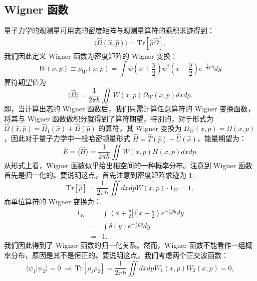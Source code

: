 \documentclass[10pt,UTF8]{ctexart}
\begin{document}
\subsection*{Wigner 函数}
\noindent
量子力学的观测量可用态的密度矩阵与观测量算符的乘积求迹得到：
\begin{eqnarray}
	\langle \hat\Omega(\hat x,\hat p)\rangle = \mathrm{Tr}[\hat \rho \hat \Omega],
\end{eqnarray}
我们因此定义 Wigner 函数为密度矩阵的 Wigner 变换：
\begin{equation}
	W(x,p) \equiv \rho_W(x,p) = \int \psi\left(x+\frac{y}{2}\right) \psi^{*}\left(x-\frac{y}{2}\right)e^{-\frac{i}{\hbar}py}dy
\end{equation}
算符期望值为
\begin{equation}
	\langle \hat \Omega\rangle = \frac{1}{2\pi \hbar} \iint W(x,p)\Omega_W(x,p) dxdp.
\end{equation}
即，当计算出态的 Wigner 函数后，我们只需计算任意算符的 Wigner 变换函数，将其与 Wigner 函数做积分就得到了算符期望，特别的，对于形式为 $\hat \Omega(\hat x,\hat p)=\hat \Omega_1(\hat x)+\hat \Omega(\hat p)$ 的算符，其 Wigner 变换为 $\Omega_W(x,p) = \Omega(x,p)$，因此对于量子力学中一般哈密顿量形式 $\hat H = \hat T(\hat p)+\hat U(\hat x)$，能量期望为：
\begin{equation}
	\bar E = \langle \hat H\rangle = \frac{1}{2\pi \hbar} \iint W(x,p)H(x,p) dxdp.
\end{equation}
从形式上看，Wigner 函数似乎给出相空间的一种概率分布。注意到 Wigner 函数首先是归一化的。要说明这点，首先注意到密度矩阵求迹为 1:
\begin{equation}
	\mathrm{Tr}[\hat \rho] = \frac{1}{2\pi \hbar}\iint dxdp W(x,p) \cdot 1_W = 1,
\end{equation}
而单位算符的 Wigner 变换为：
\begin{eqnarray}
	1_W
	&=& \int \left\langle x+\frac{y}{2}\right| \hat 1 \left|x-\frac{y}{2} \right\rangle e^{-\frac{i}{\hbar}py} dy \nonumber \\
	&=& \int \delta(y) e^{-\frac{i}{\hbar}py} dy \nonumber \\	&=& 1.
\end{eqnarray}
我们因此得到了 Wigner 函数的归一化关系。然而，Wigner 函数不能看作一组概率分布，原因是其不是恒正的。要说明这点，我们考虑两个正交波函数：
\begin{equation}
	\langle \psi_1| \psi_2\rangle = 0\ \Longrightarrow
	\ \mathrm{Tr}\left[\rho_1\rho_2 \right] = \frac{1}{2\pi \hbar} \iint dxdp W_1(x,p)W_2(x,p)=0,
\end{equation}
\end{document}
